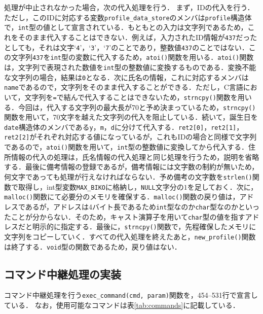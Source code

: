 処理が中止されなかった場合，次の代入処理を行う．
まず，IDの代入を行う．ただし，このIDに対応する変数\verb|profile_data_store|のメンバは\verb|profile|構造体で，\verb|int|型の値として宣言されている．もともとの入力は文字列であるため，これをそのまま代入することはできない．例えば，入力されたID情報が\verb|437|だったとしても，それは文字‘\verb|4|’，‘\verb|3|’，‘\verb|7|’のことであり，整数値\verb|437|のことではない．この文字列\verb|437|を\verb|int|型の変数に代入するため，\verb|atoi()|関数を用いる．\verb|atoi()|関数は，文字列で表現された数値を\verb|int|型の整数値に変換するものである．変換不能な文字列の場合，結果は\verb|0|となる\cite{www:label6}．次に氏名の情報，これに対応するメンバは\verb|name|であるので，文字列をそのまま代入することができる．ただし，C言語において，文字列を\verb|=|で結んで代入することはできないため，\verb|strncpy()|関数を用いる．今回は，代入する文字列の最大長が70と予め決まっているため，\verb|strncpy()|関数を用いて，70文字を越えた文字列の代入を阻止している\cite{www:label5}．続いて，誕生日を\verb|date|構造体のメンバである\verb|y|，\verb|m|，\verb|d|に分けて代入する．\verb|ret2[0]|，\verb|ret2[1]|，\verb|ret2[2]|がそれぞれ対応する値になっているが，これもIDの場合と同様で文字列であるので，\verb|atoi()|関数を用いて，\verb|int|型の整数値に変換してから代入する．住所情報の代入の処理は，氏名情報の代入処理と同じ処理を行うため，説明を省略する．最後に備考情報の登録であるが，備考情報には文字数の制約が無いため，何文字であっても処理が行えなければならない．予め備考の文字数を\verb|strlen()|関数で取得し，int型変数\verb|MAX_BIKO|に格納し，\verb|NULL|文字分の$1$を足しておく\cite{www:label8}．次に，\verb|malloc()|関数にて必要分のメモリを確保する\cite{www:label9}．\verb|malloc()|関数の戻り値は，アドレスであるが，アドレスは4バイト長であるため\verb|int|型なのか\verb|char|型なのかといったことが分からない．そのため，キャスト演算子を用いて\verb|char|型の値を指すアドレスだと明示的に指定する\cite{www:label10}．最後に，\verb|strncpy()|関数で，先程確保したメモリに文字列をコピーしていく．すべての代入処理を終えたあと，\verb|new_profile()|関数は終了する．\verb|void|型の関数であるため，戻り値はない．

\subsection{コマンド中継処理の実装}

コマンド中継処理を行う\verb|exec_command(cmd, param)|関数を，454--531行で宣言している．
なお，使用可能なコマンドは表\ref{tab:commands}に記載している．

